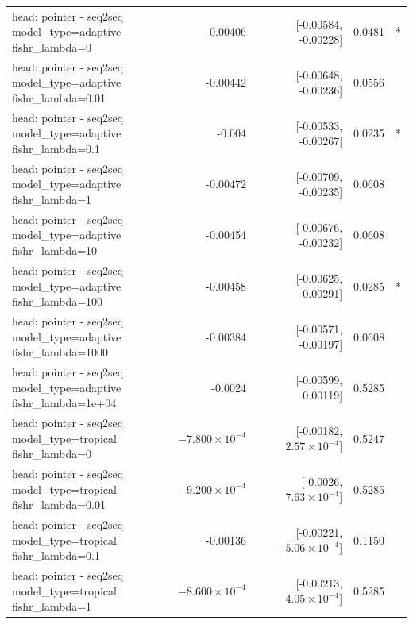 \documentclass[10pt]{article}
\makeatletter
\newcommand{\stackcell}[1]{\begin{tabular}[t]{@{}l@{}}#1\end{tabular}}
\makeatother
\begin{document}
{\begin{longtable}{lrrrl}
\stackcell{head: pointer - seq2seq\\\footnotesize model\_type=adaptive fishr\_lambda=0 } & -0.00406 & [-0.00584, -0.00228] & 0.0481 & *\\
\stackcell{head: pointer - seq2seq\\\footnotesize model\_type=adaptive fishr\_lambda=0.01 } & -0.00442 & [-0.00648, -0.00236] & 0.0556 & \\
\stackcell{head: pointer - seq2seq\\\footnotesize model\_type=adaptive fishr\_lambda=0.1 } & -0.004 & [-0.00533, -0.00267] & 0.0235 & *\\
\stackcell{head: pointer - seq2seq\\\footnotesize model\_type=adaptive fishr\_lambda=1 } & -0.00472 & [-0.00709, -0.00235] & 0.0608 & \\
\stackcell{head: pointer - seq2seq\\\footnotesize model\_type=adaptive fishr\_lambda=10 } & -0.00454 & [-0.00676, -0.00232] & 0.0608 & \\
\stackcell{head: pointer - seq2seq\\\footnotesize model\_type=adaptive fishr\_lambda=100 } & -0.00458 & [-0.00625, -0.00291] & 0.0285 & *\\
\stackcell{head: pointer - seq2seq\\\footnotesize model\_type=adaptive fishr\_lambda=1000 } & -0.00384 & [-0.00571, -0.00197] & 0.0608 & \\
\stackcell{head: pointer - seq2seq\\\footnotesize model\_type=adaptive fishr\_lambda=1e+04 } & -0.0024 & [-0.00599, 0.00119] & 0.5285 & \\
\stackcell{head: pointer - seq2seq\\\footnotesize model\_type=tropical fishr\_lambda=0 } & $-7.800\times10^{-4}$ & [-0.00182, $2.57\times10^{-4}$] & 0.5247 & \\
\stackcell{head: pointer - seq2seq\\\footnotesize model\_type=tropical fishr\_lambda=0.01 } & $-9.200\times10^{-4}$ & [-0.0026, $7.63\times10^{-4}$] & 0.5285 & \\
\stackcell{head: pointer - seq2seq\\\footnotesize model\_type=tropical fishr\_lambda=0.1 } & -0.00136 & [-0.00221, $-5.06\times10^{-4}$] & 0.1150 & \\
\stackcell{head: pointer - seq2seq\\\footnotesize model\_type=tropical fishr\_lambda=1 } & $-8.600\times10^{-4}$ & [-0.00213, $4.05\times10^{-4}$] & 0.5285 & \\

\end{longtable}}
\end{document}
